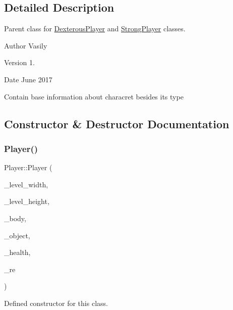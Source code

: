 \subsection{Detailed Description}
Parent class for \hyperlink{class_dexterous_player}{Dexterous\+Player} and \hyperlink{class_strong_player}{Strong\+Player} classes. 

\begin{DoxyAuthor}{Author}
Vasily 
\end{DoxyAuthor}
\begin{DoxyVersion}{Version}
1. 
\end{DoxyVersion}
\begin{DoxyDate}{Date}
June 2017
\end{DoxyDate}
Contain base information about characret besides its type 

\subsection{Constructor \& Destructor Documentation}
\mbox{\label{class_player_abf1330c477ecd5d2c0154a4876cf4154}} 
\subsubsection{\texorpdfstring{Player()}{Player()}}
{\footnotesize\ttfamily Player\+::\+Player (\begin{DoxyParamCaption}\item[{int}]{\+\_\+level\+\_\+width,  }\item[{int}]{\+\_\+level\+\_\+height,  }\item[{b2\+Body $\ast$}]{\+\_\+body,  }\item[{\hyperlink{class_object}{Object} $\ast$}]{\+\_\+object,  }\item[{int}]{\+\_\+health,  }\item[{\hyperlink{_events_8h_a51620cf702f1b8fdf47cd0a5cfa0ba4f}{Return\+Events} $\ast$}]{\+\_\+re }\end{DoxyParamCaption})\hspace{0.3cm}{\ttfamily [protected]}}



Defined constructor for this class. 


